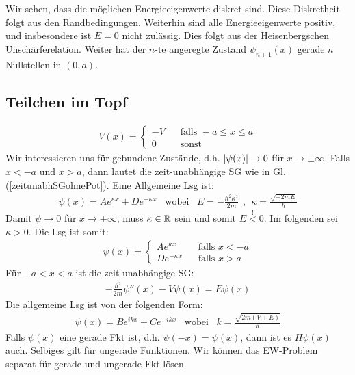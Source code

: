 Wir sehen, dass die möglichen Energieeigenwerte diskret sind. Diese Diskretheit
folgt aus den Randbedingungen. Weiterhin sind alle Energieeigenwerte positiv,
und insbesondere ist $E=0$ nicht zulässig. Dies folgt aus der Heisenbergschen
Unschärferelation. Weiter hat der $n$-te angeregte Zustand $\psi_{n+1}(x)$
gerade $n$ Nullstellen in $(0,a)$.

\subsection{Teilchen im Topf}\label{Teilchen_im_Topf}
\begin{align*}
    V(x) = \begin{cases}
        - V \hspace{10pt} &\text{falls } -a \leq x \leq a
        \\
        0 \hspace{10pt} &\text{sonst}
    \end{cases}
\end{align*}
Wir interessieren uns für gebundene Zustände, d.h. $\left\vert \psi(x) \right\vert \rightarrow
0$ für $x \rightarrow \pm \infty$. Falls $x<-a$ und $x>a$, dann lautet die
zeit-unabhängige SG wie in Gl. (\ref{zeitunabhSGohnePot}). Eine Allgemeine
Lsg ist:
\begin{align*}
    \psi(x) = A e^{\kappa x} + D e^{- \kappa x}
    \hspace{10pt} \text{wobei} \hspace{10pt}
    E = - \frac{\hbar^2 \kappa^2}{2 m}
    \hspace{5pt} , \hspace{5pt}
    \kappa = \frac{\sqrt{-2mE}}{\hbar}
\end{align*}
Damit $\psi \rightarrow 0$ für $x \rightarrow \pm \infty$, muss $\kappa \in \mathbb{R}$
sein und somit $E\stackrel{!}{<}0$. Im folgenden sei $\kappa >0$. Die Lsg
ist somit:
\begin{align*}
    \psi(x) = \begin{cases}
        A e^{\kappa x} \hspace{10pt} &\text{falls } x < -a
        \\
        D e^{-\kappa x} \hspace{10pt} &\text{falls } x > a
    \end{cases}
\end{align*}
Für $-a < x < a$ ist die zeit-unabhängige SG:
\begin{align*}
    - \frac{\hbar^2}{2m} \psi'' (x) - V \psi(x) = E \psi(x)
\end{align*}
Die allgemeine Lsg ist von der folgenden Form:
\begin{align*}
    \psi(x) = B e^{i k x} + C e^{-i k x}
    \hspace{10pt} \text{wobei} \hspace{10pt}
    k = \frac{\sqrt{2m(V+E)}}{\hbar}
\end{align*}
Falls $\psi(x)$ eine gerade Fkt ist, d.h. $\psi(-x) = \psi(x)$, dann ist es
$H \psi(x)$ auch. Selbiges gilt für ungerade Funktionen. Wir können das EW-Problem
separat für gerade und ungerade Fkt lösen.

